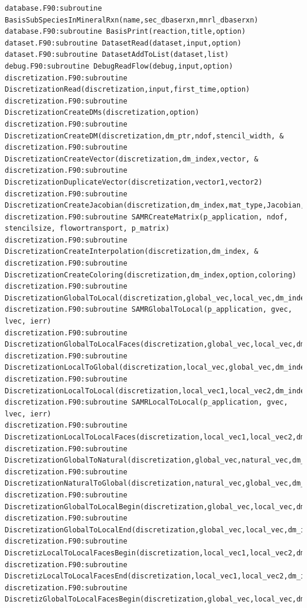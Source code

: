 \documentclass[12pt]{article}
\begin{document}
\begin{verbatim}
database.F90:subroutine BasisSubSpeciesInMineralRxn(name,sec_dbaserxn,mnrl_dbaserxn)
database.F90:subroutine BasisPrint(reaction,title,option)
dataset.F90:subroutine DatasetRead(dataset,input,option)
dataset.F90:subroutine DatasetAddToList(dataset,list)
debug.F90:subroutine DebugReadFlow(debug,input,option)
discretization.F90:subroutine DiscretizationRead(discretization,input,first_time,option)
discretization.F90:subroutine DiscretizationCreateDMs(discretization,option)
discretization.F90:subroutine DiscretizationCreateDM(discretization,dm_ptr,ndof,stencil_width, &
discretization.F90:subroutine DiscretizationCreateVector(discretization,dm_index,vector, &
discretization.F90:subroutine DiscretizationDuplicateVector(discretization,vector1,vector2)
discretization.F90:subroutine DiscretizationCreateJacobian(discretization,dm_index,mat_type,Jacobian,option)
discretization.F90:subroutine SAMRCreateMatrix(p_application, ndof, stencilsize, flowortransport, p_matrix)
discretization.F90:subroutine DiscretizationCreateInterpolation(discretization,dm_index, &
discretization.F90:subroutine DiscretizationCreateColoring(discretization,dm_index,option,coloring)
discretization.F90:subroutine DiscretizationGlobalToLocal(discretization,global_vec,local_vec,dm_index)
discretization.F90:subroutine SAMRGlobalToLocal(p_application, gvec, lvec, ierr)
discretization.F90:subroutine DiscretizationGlobalToLocalFaces(discretization,global_vec,local_vec,dm_index)
discretization.F90:subroutine DiscretizationLocalToGlobal(discretization,local_vec,global_vec,dm_index)
discretization.F90:subroutine DiscretizationLocalToLocal(discretization,local_vec1,local_vec2,dm_index)
discretization.F90:subroutine SAMRLocalToLocal(p_application, gvec, lvec, ierr)
discretization.F90:subroutine DiscretizationLocalToLocalFaces(discretization,local_vec1,local_vec2,dm_index)
discretization.F90:subroutine DiscretizationGlobalToNatural(discretization,global_vec,natural_vec,dm_index)
discretization.F90:subroutine DiscretizationNaturalToGlobal(discretization,natural_vec,global_vec,dm_index)
discretization.F90:subroutine DiscretizationGlobalToLocalBegin(discretization,global_vec,local_vec,dm_index)
discretization.F90:subroutine DiscretizationGlobalToLocalEnd(discretization,global_vec,local_vec,dm_index)
discretization.F90:subroutine DiscretizLocalToLocalFacesBegin(discretization,local_vec1,local_vec2,dm_index)
discretization.F90:subroutine DiscretizLocalToLocalFacesEnd(discretization,local_vec1,local_vec2,dm_index)
discretization.F90:subroutine DiscretizGlobalToLocalFacesBegin(discretization,global_vec,local_vec,dm_index)

\end{verbatim}
\end{document}
